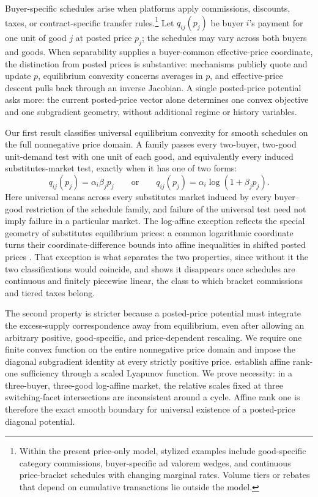 \documentclass[11pt,a4paper,fleqn]{article}
\theoremstyle{plain}
\theoremstyle{definition}
\begin{document}
Buyer-specific schedules arise when platforms apply commissions, discounts, taxes, or contract-specific transfer rules.\footnote{Within the present price-only model, stylized examples include good-specific category commissions, buyer-specific ad valorem wedges, and continuous price-bracket schedules with changing marginal rates. Volume tiers or rebates that depend on cumulative transactions lie outside the model.} Let $q_{ij}(p_j)$ be buyer $i$'s payment for one unit of good $j$ at posted price $p_j$; the schedules may vary across both buyers and goods. When separability supplies a buyer-common effective-price coordinate, the distinction from posted prices is substantive: mechanisms publicly quote and update $p$, equilibrium convexity concerns averages in $p$, and effective-price descent pulls back through an inverse Jacobian. A single posted-price potential asks more: the current posted-price vector alone determines one convex objective and one subgradient geometry, without additional regime or history variables.

Our first result classifies universal equilibrium convexity for smooth schedules on the full nonnegative price domain. A family passes every two-buyer, two-good unit-demand test with one unit of each good, and equivalently every induced substitutes-market test, exactly when it has one of two forms:
\[
q_{ij}(p_j)=\alpha_i\beta_jp_j
\qquad\text{or}\qquad
q_{ij}(p_j)=\alpha_i\log(1+\beta_jp_j).
\]
Here universal means across every substitutes market induced by every buyer--good restriction of the schedule family, and failure of the universal test need not imply failure in a particular market. The log-affine exception reflects the special geometry of substitutes equilibrium prices: a common logarithmic coordinate turns their coordinate-difference bounds into affine inequalities in shifted posted prices \citep{murota2003,moriguchimurota2023}. That exception is what separates the two properties, since without it the two classifications would coincide, and  shows it disappears once schedules are continuous and finitely piecewise linear, the class to which bracket commissions and tiered taxes belong.

The second property is stricter because a posted-price potential must integrate the excess-supply correspondence away from equilibrium, even after allowing an arbitrary positive, good-specific, and price-dependent rescaling. We require one finite convex function on the entire nonnegative price domain and impose the diagonal subgradient identity at every strictly positive price. \citet{okisato2026} establish affine rank-one sufficiency through a scaled Lyapunov function. We prove necessity: in a three-buyer, three-good log-affine market, the relative scales fixed at three switching-facet intersections are inconsistent around a cycle. Affine rank one is therefore the exact smooth boundary for universal existence of a posted-price diagonal potential.
\end{document}
